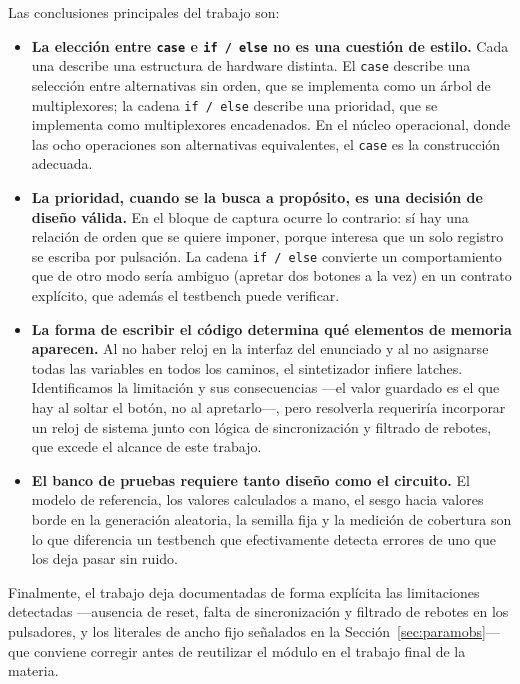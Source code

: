 \documentclass[12pt,a4paper]{article}
\begin{document}
Las conclusiones principales del trabajo son:

\begin{itemize}[leftmargin=2em,itemsep=0.35em]
  \item \textbf{La elección entre \texttt{case} e \texttt{if / else} no es una
        cuestión de estilo.} Cada una describe una estructura de hardware
        distinta. El \texttt{case} describe una selección entre alternativas sin
        orden, que se implementa como un árbol de multiplexores; la cadena
        \texttt{if / else} describe una prioridad, que se implementa como
        multiplexores encadenados. En el núcleo operacional, donde las ocho
        operaciones son alternativas equivalentes, el \texttt{case} es la
        construcción adecuada.

  \item \textbf{La prioridad, cuando se la busca a propósito, es una decisión de
        diseño válida.} En el bloque de captura ocurre lo contrario: sí hay una
        relación de orden que se quiere imponer, porque interesa que un solo
        registro se escriba por pulsación. La cadena \texttt{if / else}
        convierte un comportamiento que de otro modo sería ambiguo (apretar dos
        botones a la vez) en un contrato explícito, que además el testbench
        puede verificar.

  \item \textbf{La forma de escribir el código determina qué elementos de
        memoria aparecen.} Al no haber reloj en la interfaz del enunciado y al
        no asignarse todas las variables en todos los caminos, el sintetizador
        infiere latches. Identificamos la limitación y sus consecuencias —el
        valor guardado es el que hay al soltar el botón, no al apretarlo—, pero
        resolverla requeriría incorporar un reloj de sistema junto con lógica de
        sincronización y filtrado de rebotes, que excede el alcance de este
        trabajo.

  \item \textbf{El banco de pruebas requiere tanto diseño como el circuito.} El
        modelo de referencia, los valores calculados a mano, el sesgo hacia
        valores borde en la generación aleatoria, la semilla fija y la medición
        de cobertura son lo que diferencia un testbench que efectivamente
        detecta errores de uno que los deja pasar sin ruido.
\end{itemize}

Finalmente, el trabajo deja documentadas de forma explícita las limitaciones
detectadas —ausencia de reset, falta de sincronización y filtrado de rebotes en
los pulsadores, y los literales de ancho fijo señalados en la
Sección~\ref{sec:paramobs}— que conviene corregir antes de reutilizar el módulo
en el trabajo final de la materia.
\end{document}
